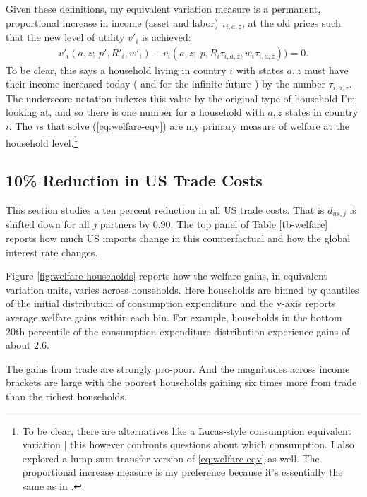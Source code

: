 \documentclass[12pt,pdftex]{article}
\begin{document}
\begin{onehalfspacing}
Given these definitions, my equivalent variation measure is a permanent, proportional increase in income (asset and labor) $\tau_{i,a,z}$, at the old prices such that the new level of utility $v'_i$ is achieved:
\begin{align}
v'_i(a, z ; \ p', R'_{i}, w'_{i}) - v_i(a, z ; \ p, R_{i}\tau_{i,a,z}, w_{i}\tau_{i,a,z})) = 0. \label{eq:welfare-eqv}
\end{align}
To be clear, this says a household living in country $i$ with states $a,z$ must have their income increased today ( and for the infinite future ) by the number $\tau_{i,a,z}$. The underscore notation indexes this value by the original-type of household I'm looking at, and so there is one number for a household with $a,z$ states in country $i$. The $\tau$s that solve (\ref{eq:welfare-eqv}) are my primary measure of welfare at the household level.\footnote{To be clear, there are alternatives like a Lucas-style consumption equivalent variation | this however confronts questions about which consumption. I also explored a lump sum transfer version of \ref{eq:welfare-eqv} as well. The proportional increase measure is my preference because it's essentially the same as in \citet{auer2022unequal}.}

\subsection{10\% Reduction in US Trade Costs}

This section studies a ten percent reduction in all US trade costs. That is $d_{us,j}$ is shifted down for all $j$ partners by $0.90$. The top panel of Table \ref{tb-welfare} reports how much US imports change in this counterfactual and how the global interest rate changes.

Figure \ref{fig:welfare-households} reports how the welfare gains, in equivalent variation units, varies across households. Here households are binned by quantiles of the initial distribution of consumption expenditure and the y-axis reports average welfare gains within each bin. For example, households in the bottom 20th percentile of the consumption expenditure distribution experience gains of about $2.6$.

The gains from trade are strongly pro-poor. And the magnitudes across income brackets are large with the poorest households gaining six times more from trade than the richest households.


\end{onehalfspacing}
\end{document}
